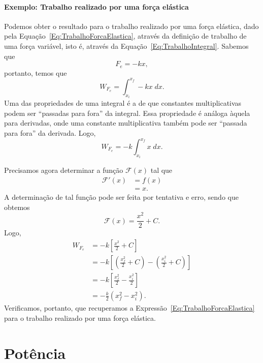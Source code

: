 \paragraph{Exemplo: Trabalho realizado por uma força elástica}

Podemos obter o resultado para o trabalho realizado por uma força elástica, dado pela Equação~\eqref{Eq:TrabalhoForcaElastica}, através da definição de trabalho de uma força variável, isto é, através da Equação~\eqref{Eq:TrabalhoIntegral}. Sabemos que
\begin{equation}
    F_e = - k x,
\end{equation}
%
portanto, temos que
\begin{equation}
    W_{F_e} = \int_{x_i}^{x_f} -kx\;dx.
\end{equation}
%
Uma das propriedades de uma integral é a de que constantes multiplicativas podem ser ``passadas para fora'' da integral. Essa propriedade é análoga àquela para derivadas, onde uma constante multiplicativa também pode ser ``passada para fora'' da derivada. Logo,
\begin{equation}
    W_{F_e} = -k \int_{x_i}^{x_f} x \;dx.
\end{equation}

Precisamos agora determinar a função $\mathcal{F}(x)$ tal que
\begin{align}
    \mathcal{F}'(x) &= f(x) \\
    & = x.
\end{align}
%
A determinação de tal função pode ser feita por tentativa e erro, sendo que obtemos
\begin{equation}
    \mathcal{F}(x) = \frac{x^2}{2} + C.
\end{equation}
%
Logo,
\begin{align}
    W_{F_e} &= -k \left[\frac{x^2}{2} + C\right] \\
    &= -k \left[\left(\frac{x_f^2}{2} + C\right) - \left(\frac{x_i^2}{2} + C\right)\right] \\
    &= -k \left[\frac{x_f^2}{2} - \frac{x_i^2}{2}\right] \\
    &= -\frac{k}{2} (x_f^2 - x_i^2).
\end{align}
%
Verificamos, portanto, que recuperamos a Expressão~\eqref{Eq:TrabalhoForcaElastica} para o trabalho realizado por uma força elástica.

\section{Potência}

